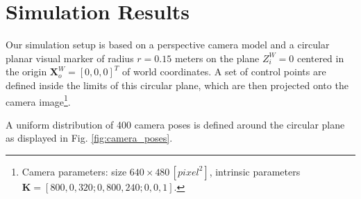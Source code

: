 \documentclass[letterpaper, 10 pt, conference]{ieeeconf}  %
\begin{document}
	
	
	\section{Simulation Results}
	\label{SimSetup}
	Our simulation setup is based on a perspective camera model and a circular planar visual marker of radius $r=0.15$ meters on the plane $Z^W_i=0$ centered in the origin $\mathbf{X}^W_o =[0,0,0]^T$ of world coordinates. A set of control points are defined inside the limits of this circular plane, which are then projected onto the camera image\footnote{Camera parameters: size $640 \times 480\,[pixel^2]$, intrinsic parameters $\mathbf{K}=[800, 0, 320 ; 0 , 800 , 240 ; 0 , 0 , 1]$.}. 
	
	
	A uniform distribution of 400 camera poses is defined around the circular plane as displayed in Fig. \ref{fig:camera_poses}. 
	
	
	
\end{document}
